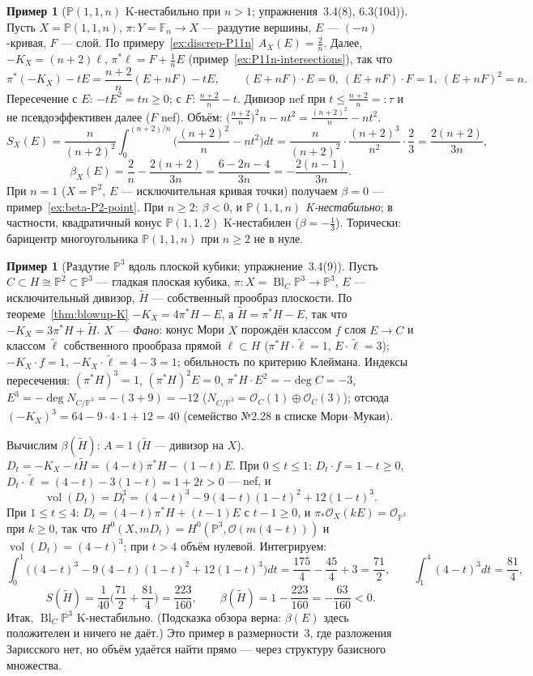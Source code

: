 \documentclass[11pt,a4paper]{article}
\theoremstyle{plain}
\theoremstyle{definition}
\newtheorem{example}[theorem]{Пример}
\theoremstyle{remark}
\newcommand{\PP}{\mathbb{P}}
\newcommand{\cO}{\mathcal{O}}
\DeclareMathOperator{\Bl}{Bl}
\DeclareMathOperator{\vol}{vol}
\begin{document}
\begin{example}[$\PP(1,1,n)$ K-нестабильно при $n>1$; упражнения~3.4(8), 6.3(10d)]\label{ex:beta-P11n}
Пусть $X=\PP(1,1,n)$, $\pi\colon Y=\mathbb F_n\to X$ --- раздутие вершины, $E$ --- $(-n)$-кривая,
$F$ --- слой. По примеру~\ref{ex:discrep-P11n} $A_X(E)=\frac2n$. Далее, $-K_X=(n+2)\ell$,
$\pi^*\ell=F+\frac1nE$ (пример~\ref{ex:P11n-intersections}), так что
\[
\pi^*(-K_X)-tE=\frac{n+2}n(E+nF)-tE,\qquad (E+nF)\cdot E=0,\ (E+nF)\cdot F=1,\ (E+nF)^2=n .
\]
Пересечение с $E$: $-tE^2=tn\ge0$; с $F$: $\frac{n+2}n-t$. Дивизор nef при $t\le\frac{n+2}n=:\tau$
и не псевдоэффективен далее ($F$ nef). Объём: $\big(\frac{n+2}n\big)^2n-nt^2=\frac{(n+2)^2}n-nt^2$.
\[
S_X(E)=\frac n{(n+2)^2}\int_0^{(n+2)/n}\Big(\frac{(n+2)^2}n-nt^2\Big)dt
=\frac n{(n+2)^2}\cdot\frac{(n+2)^3}{n^2}\cdot\frac23=\frac{2(n+2)}{3n},
\]
\[
\beta_X(E)=\frac2n-\frac{2(n+2)}{3n}=\frac{6-2n-4}{3n}=-\frac{2(n-1)}{3n}.
\]
При $n=1$ ($X=\PP^2$, $E$ --- исключительная кривая точки) получаем $\beta=0$ --- пример~\ref{ex:beta-P2-point}.
При $n\ge2$: $\beta<0$, и \emph{$\PP(1,1,n)$ K-нестабильно}; в частности, квадратичный конус
$\PP(1,1,2)$ K-нестабилен ($\beta=-\frac13$). Торически: барицентр многоугольника $\PP(1,1,n)$ при
$n\ge2$ не в нуле.
\end{example}

\begin{example}[Раздутие $\PP^3$ вдоль плоской кубики; упражнение~3.4(9)]\label{ex:Bl-cubic-P3}
Пусть $C\subset H\cong\PP^2\subset\PP^3$ --- гладкая плоская кубика, $\pi\colon X=\Bl_C\PP^3\to\PP^3$,
$E$ --- исключительный дивизор, $\tilde H$ --- собственный прообраз плоскости. По
теореме~\ref{thm:blowup-K} $-K_X=4\pi^*H-E$, а $\tilde H=\pi^*H-E$, так что $-K_X=3\pi^*H+\tilde H$.
\emph{$X$ --- Фано}: конус Мори $X$ порождён классом $f$ слоя $E\to C$ и классом $\tilde\ell$
собственного прообраза прямой $\ell\subset H$ ($\pi^*H\cdot\tilde\ell=1$, $E\cdot\tilde\ell=3$);
$-K_X\cdot f=1$, $-K_X\cdot\tilde\ell=4-3=1$; обильность по критерию Клеймана. Индексы пересечения:
$(\pi^*H)^3=1$, $(\pi^*H)^2E=0$, $\pi^*H\cdot E^2=-\deg C=-3$, $E^3=-\deg N_{C/\PP^3}=-(3+9)=-12$
($N_{C/\PP^3}=\cO_C(1)\oplus\cO_C(3)$); отсюда $(-K_X)^3=64-9\cdot4\cdot1+12=40$ (семейство
№2.28 в списке Мори--Мукаи).

Вычислим $\beta(\tilde H)$: $A=1$ ($\tilde H$ --- дивизор на $X$). $D_t=-K_X-t\tilde H=(4-t)\pi^*H-(1-t)E$.
При $0\le t\le1$: $D_t\cdot f=1-t\ge0$, $D_t\cdot\tilde\ell=(4-t)-3(1-t)=1+2t>0$ --- nef, и
\[
\vol(D_t)=D_t^3=(4-t)^3-9(4-t)(1-t)^2+12(1-t)^3 .
\]
При $1\le t\le4$: $D_t=(4-t)\pi^*H+(t-1)E$ с $t-1\ge0$, и $\pi_*\cO_X(kE)=\cO_{\PP^3}$ при $k\ge0$,
так что $H^0(X,mD_t)=H^0(\PP^3,\cO(m(4-t)))$ и $\vol(D_t)=(4-t)^3$; при $t>4$ объём нулевой.
Интегрируем:
\[
\int_0^1\!\big((4-t)^3-9(4-t)(1-t)^2+12(1-t)^3\big)dt=\frac{175}4-\frac{45}4+3=\frac{71}2,\qquad
\int_1^4(4-t)^3dt=\frac{81}4,
\]
\[
S(\tilde H)=\frac1{40}\Big(\frac{71}2+\frac{81}4\Big)=\frac{223}{160},\qquad
\beta(\tilde H)=1-\frac{223}{160}=-\frac{63}{160}<0 .
\]
Итак, $\Bl_C\PP^3$ K-нестабильно. (Подсказка обзора верна: $\beta(E)$ здесь положителен и ничего
не даёт.) Это пример в размерности~3, где разложения Зарисского нет, но объём удаётся найти
прямо --- через структуру базисного множества.
\end{example}
\end{document}
